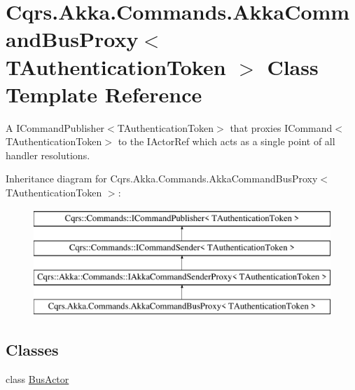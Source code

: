 \hypertarget{classCqrs_1_1Akka_1_1Commands_1_1AkkaCommandBusProxy}{}\section{Cqrs.\+Akka.\+Commands.\+Akka\+Command\+Bus\+Proxy$<$ T\+Authentication\+Token $>$ Class Template Reference}
\label{classCqrs_1_1Akka_1_1Commands_1_1AkkaCommandBusProxy}


A I\+Command\+Publisher$<$\+T\+Authentication\+Token$>$ that proxies I\+Command$<$\+T\+Authentication\+Token$>$ to the I\+Actor\+Ref which acts as a single point of all handler resolutions.  


Inheritance diagram for Cqrs.\+Akka.\+Commands.\+Akka\+Command\+Bus\+Proxy$<$ T\+Authentication\+Token $>$\+:\begin{figure}[H]
\begin{center}
\leavevmode
\includegraphics[height=4.000000cm]{classCqrs_1_1Akka_1_1Commands_1_1AkkaCommandBusProxy}
\end{center}
\end{figure}
\subsection*{Classes}
\begin{DoxyCompactItemize}
\item 
class \hyperlink{classCqrs_1_1Akka_1_1Commands_1_1AkkaCommandBusProxy_1_1BusActor}{Bus\+Actor}
\end{DoxyCompactItemize}
